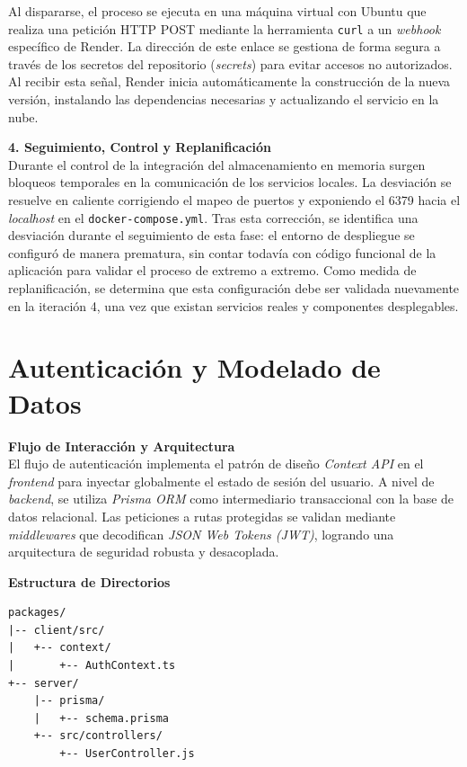 Al dispararse, el proceso se ejecuta en una máquina virtual con Ubuntu que realiza una petición HTTP POST mediante la herramienta \texttt{curl} a un \textit{webhook} específico de Render. La dirección de este enlace se gestiona de forma segura a través de los secretos del repositorio (\textit{secrets}) para evitar accesos no autorizados. Al recibir esta señal, Render inicia automáticamente la construcción de la nueva versión, instalando las dependencias necesarias y actualizando el servicio en la nube.

\textbf{4. Seguimiento, Control y Replanificación} \\
Durante el control de la integración del almacenamiento en memoria surgen bloqueos temporales en la comunicación de los servicios locales. La desviación se resuelve en caliente corrigiendo el mapeo de puertos y exponiendo el 6379 hacia el \textit{localhost} en el \texttt{docker-compose.yml}. Tras esta corrección, se identifica una desviación durante el seguimiento de esta fase: el entorno de despliegue se configuró de manera prematura, sin contar todavía con código funcional de la aplicación para validar el proceso de extremo a extremo. Como medida de replanificación, se determina que esta configuración debe ser validada nuevamente en la iteración 4, una vez que existan servicios reales y componentes desplegables.

\section{Autenticación y Modelado de Datos}

\textbf{Flujo de Interacción y Arquitectura} \\
El flujo de autenticación implementa el patrón de diseño \textit{Context API} en el \textit{frontend} para inyectar globalmente el estado de sesión del usuario. A nivel de \textit{backend}, se utiliza \textit{Prisma ORM} como intermediario transaccional con la base de datos relacional. Las peticiones a rutas protegidas se validan mediante \textit{middlewares} que decodifican \textit{JSON Web Tokens (JWT)}, logrando una arquitectura de seguridad robusta y desacoplada.

\textbf{Estructura de Directorios} \\
\begin{verbatim}
packages/
|-- client/src/
|   +-- context/
|       +-- AuthContext.ts
+-- server/
    |-- prisma/
    |   +-- schema.prisma
    +-- src/controllers/
        +-- UserController.js
\end{verbatim}

